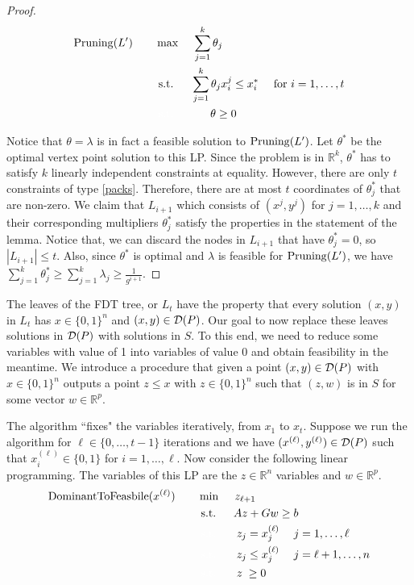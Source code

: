 \begin{proof}
\begin{align}
\prun(L')\quad\quad& \max\quad \;\sum_{j=1}^{k} \theta_j\\
&\;\text{s.t.} \quad \;\;\sum_{j=1}^{k} \theta_j x^j_i\leq x^*_i &\mbox{ for $i=1,\ldots,t$} \label{packs}\\
&\;{\color{white}{\text{s.t.}} }\quad  \;\quad\quad\theta \geq 0\label{nonneg}
\end{align}
 
Notice that $\theta = \lambda$ is in fact a feasible solution to $\operatorname{Pruning}(L')$. Let $\theta^*$ be the optimal vertex point solution to this LP. Since the problem is in $\mathbb{R}^k$,  $\theta^*$ has to satisfy $k$ linearly independent constraints at equality. However, there are only $t$ constraints of type \ref{packs}. Therefore, there are at most $t$ coordinates of $\theta^*_j$ that are non-zero. We claim that $L_{i+1}$ which consists of $(x^j,y^j)$ for $j=1,\ldots,k$ and their corresponding multipliers $\theta^*_j$ satisfy the properties in the statement of the lemma. Notice that, we can discard the nodes in $L_{i+1}$ that have $\theta^*_j=0$, so $|L_{i+1}| \leq t$. Also, since $\theta^*$ is optimal and $\lambda$ is feasible for $\operatorname{Pruning}(L')$, we have $\sum_{j=1}^{k} \theta^*_j \geq \sum_{j=1}^{k}\lambda_j \geq \frac{1}{g^{i+1}}$. 
\end{proof}


The leaves of the FDT tree, or $L_t$ have the property that every solution $(x,y)$ in $L_t$ has $x\in\{0,1\}^n$ and $(x,y)\in \operatorname{\mathcal{D}}(P)$. Our goal to now replace these leaves solutions in $\operatorname{\mathcal{D}}(P)$ with solutions in $S$. To this end, we need to reduce some variables with value of 1 into variables of value 0 and obtain feasibility in the meantime. We introduce a procedure that given a  point $(x,y)\in \operatorname{\mathcal{D}}(P)$ with $x\in \{0,1\}^n$ outputs a point $z\leq x$ with $z\in \{0,1\}^n$ such that $(z,w)$ is in $S$ for some vector $w\in \mathbb{R}^p$. 

The algorithm ``fixes" the variables iteratively, from $x_1$ to $x_t$. Suppose we run the algorithm for $\ell\in \{0,\ldots,t-1\}$ iterations and we have $(x^{(\ell)},y^{(\ell)})\in \operatorname{\mathcal{D}}(P)$  such that $x^{(\ell)}_i\in \{0,1\}$ for $i=1,\ldots,\ell$. Now consider the following linear programming. The variables of this LP are the $z\in \mathbb{R}^n$ variables and $w\in \mathbb{R}^p$.
\begin{align}
\DOMtoS(x^{(\ell)})\quad\quad& \min\quad \;z_{\ell+1}\\
&\;\text{s.t.} \quad \;\;Az+ Gw\geq b \\
&\;{\color{white}{\text{s.t.}} }\quad \;\; \; z_j = x^{(\ell)}_j \quad \; j =1,\ldots, \ell\\
&\;{\color{white}{\text{s.t.}} }\quad \; \;\; z_j \leq x^{(\ell)}_j \quad \; j = \ell+1,\ldots,n\\
&\;{\color{white}{\text{s.t.}} }\quad \; \;\; z\;\geq 0
\end{align}

